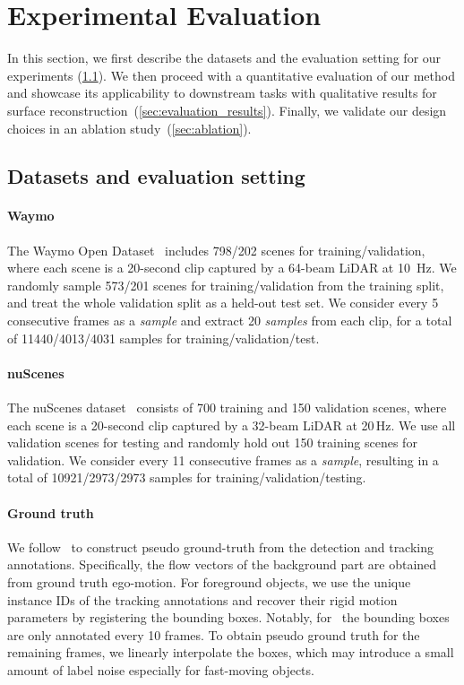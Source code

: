 \section{Experimental Evaluation}
\label{sec:results}
In this section, we first describe the datasets and the evaluation setting for our experiments (\cref{sec:dataset_evalsetting}). We then proceed with a quantitative evaluation of our method and showcase its applicability to downstream tasks with qualitative results for surface reconstruction~(\cref{sec:evaluation_results}). Finally, we validate our design choices in an ablation study~(\cref{sec:ablation}).

\subsection{Datasets and evaluation setting}
\label{sec:dataset_evalsetting}

\paragraph{Waymo} The Waymo Open Dataset~\cite{sun2020scalability} includes 798/202 scenes for training/validation, where each scene is a 20-second clip captured by a 64-beam LiDAR at 10~Hz. We randomly sample 573/201 scenes for training/validation from the training split, and treat the whole validation split as a held-out test set. We consider every 5 consecutive frames as a \textit{sample} and extract 20 \textit{samples} from each clip, for a total of 11440/4013/4031 samples for training/validation/test. %
    
\paragraph{nuScenes} The nuScenes dataset~\cite{caesar2020nuscenes} consists of 700 training and 150 validation scenes, where each scene is a 20-second clip captured by a 32-beam LiDAR at 20$\,$Hz. We use all validation scenes for testing and randomly hold out 150 training scenes for validation. We consider every 11 consecutive frames as a \textit{sample}, resulting in a total of 10921/2973/2973 samples for training/validation/testing.

\paragraph{Ground truth} We follow~\cite{jund2021scalable} to construct pseudo ground-truth from the detection and tracking annotations. Specifically, the flow vectors of the background part are obtained from ground truth ego-motion. For foreground objects, we use the
unique instance IDs of the tracking annotations and recover their rigid motion parameters by registering the bounding boxes.
Notably, for \nuscenes~the bounding boxes are only annotated every 10 frames. To obtain pseudo ground truth for the remaining frames, we linearly interpolate the boxes, which may introduce a small amount of label noise especially for fast-moving objects.


